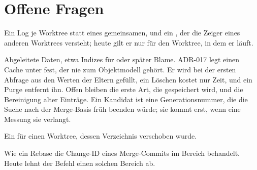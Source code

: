\section{Offene Fragen}

\startitemize
\item Ein Log je Worktree statt eines gemeinsamen, und ein , der die Zeiger
eines anderen Worktrees versteht; heute gilt er nur für den Worktree, in dem er läuft.
\item Abgeleitete Daten, etwa Indizes für  oder später Blame.
ADR-017 legt einen Cache unter  fest, der nie zum
Objektmodell gehört. Er wird bei der ersten Abfrage aus den Werten der Eltern gefüllt, ein
Löschen kostet nur Zeit, und ein Purge entfernt ihn. Offen bleiben die erste Art, die
gespeichert wird, und die Bereinigung alter Einträge.
Ein Kandidat ist eine Generationsnummer, die die Suche nach der Merge-Basis früh beenden
würde; sie kommt erst, wenn eine Messung sie verlangt.
\item Ein  für einen Worktree, dessen Verzeichnis verschoben wurde.
\item Wie ein Rebase die Change-ID eines Merge-Commits im Bereich behandelt.
Heute lehnt der Befehl einen solchen Bereich ab.
\stopitemize
